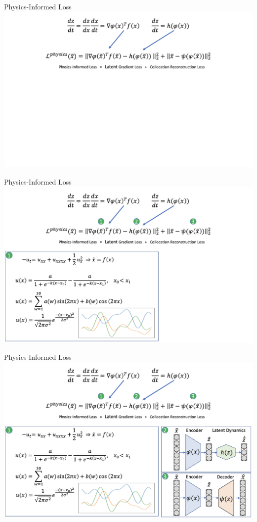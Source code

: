 \documentclass[8pt]{beamer}
\begin{document}
\begin{frame}{Physics-Informed Loss}
	\includegraphics[width=\textwidth]{Figures/collocations_3.png}
\end{frame}

\begin{frame}{Physics-Informed Loss}
	\includegraphics[width=\textwidth]{Figures/collocations_4.png}
\end{frame}

\begin{frame}{Physics-Informed Loss}
	\includegraphics[width=\textwidth]{Figures/collocations_5.png}
\end{frame}
\end{document}
